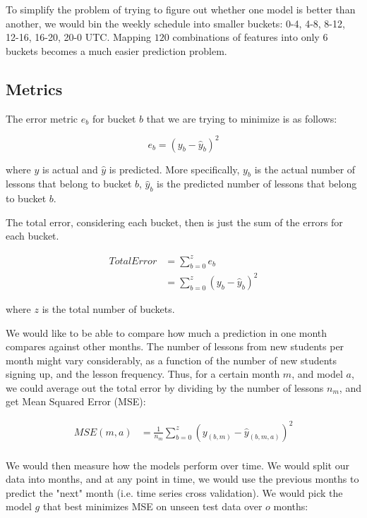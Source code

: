 \documentclass{article}
\begin{document}
To simplify the problem of trying to figure out whether one model is better
than another, we would bin the weekly schedule into smaller buckets: 0-4, 4-8,
8-12, 12-16, 16-20, 20-0 UTC. Mapping $120$ combinations of features
into only $6$ buckets becomes a much easier prediction problem.

\subsection{Metrics}

The error metric $e_b$ for bucket $b$ that we are trying to minimize is as follows:

\begin{equation}
  e_b = (y_{b} - \hat{y}_{b})^2
\end{equation}

where $y$ is actual and $\hat{y}$ is predicted.  More specifically, $y_{b}$
is the actual number of lessons that belong to bucket $b$, $\hat{y}_{b}$ is
the predicted number of lessons that belong to bucket $b$.

The total error, considering each bucket, then is just the sum of the errors
for each bucket.

\begin{align}
  Total Error &= \sum_{b=0}^{z}{e_b} \\
              &= \sum_{b=0}^{z}{(y_{b} - \hat{y}_{b})^2}
\end{align}

where $z$ is the total number of buckets.

We would like to be able to compare how much a prediction in one month compares
against other months. The number of lessons from new students per month might
vary considerably, as a function of the number of new students signing up, and
the lesson frequency. Thus, for a certain month $m$, and model $a$, we could
average out the total error by dividing by the number of lessons $n_m$, and get
Mean Squared Error (MSE):

\begin{align}
  MSE(m,a) &= \frac{1}{n_m}\sum_{b=0}^{z}{(y_{(b,m)} - \hat{y}_{(b,m,a)})^2}\\
\end{align}

We would then measure how the models perform over time. We would split our data
into months, and at any point in time, we would use the previous months to
predict the "next" month (i.e. time series cross validation)\cite{tscv}. We would pick the
model $g$ that best minimizes MSE on unseen test data over $o$ months:
\end{document}
